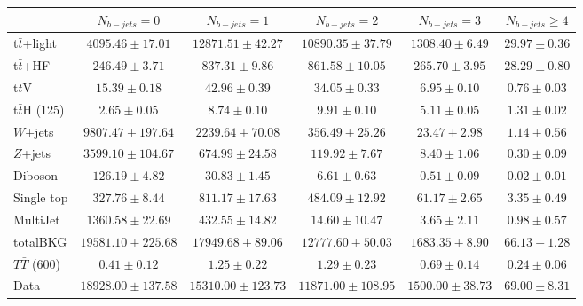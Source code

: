 \begin{tabular}{l c c c c c } \toprule
 & $N_{b-jets}= 0$ & $N_{b-jets}= 1$ & $N_{b-jets}= 2$ & $N_{b-jets}= 3$ & $N_{b-jets}\geq 4$ \\ \midrule 
 t$\bar{t}$+light & $4095.46 \pm 17.01$  & $12871.51 \pm 42.27$  & $10890.35 \pm 37.79$  & $1308.40 \pm 6.49$  & $29.97 \pm 0.36$  \\ 
 t$\bar{t}$+HF & $246.49 \pm 3.71$  & $837.31 \pm 9.86$  & $861.58 \pm 10.05$  & $265.70 \pm 3.95$  & $28.29 \pm 0.80$  \\ \midrule 
 t$\bar{t}$V & $15.39 \pm 0.18$  & $42.96 \pm 0.39$  & $34.05 \pm 0.33$  & $6.95 \pm 0.10$  & $0.76 \pm 0.03$  \\ 
 t$\bar{t}$H (125) & $2.65 \pm 0.05$  & $8.74 \pm 0.10$  & $9.91 \pm 0.10$  & $5.11 \pm 0.05$  & $1.31 \pm 0.02$  \\ 
 $W$+jets & $9807.47 \pm 197.64$  & $2239.64 \pm 70.08$  & $356.49 \pm 25.26$  & $23.47 \pm 2.98$  & $1.14 \pm 0.56$  \\ 
 $Z$+jets & $3599.10 \pm 104.67$  & $674.99 \pm 24.58$  & $119.92 \pm 7.67$  & $8.40 \pm 1.06$  & $0.30 \pm 0.09$  \\ 
 Diboson & $126.19 \pm 4.82$  & $30.83 \pm 1.45$  & $6.61 \pm 0.63$  & $0.51 \pm 0.09$  & $0.02 \pm 0.01$  \\ 
 Single top & $327.76 \pm 8.44$  & $811.17 \pm 17.63$  & $484.09 \pm 12.92$  & $61.17 \pm 2.65$  & $3.35 \pm 0.49$  \\ 
 MultiJet & $1360.58 \pm 22.69$  & $432.55 \pm 14.82$  & $14.60 \pm 10.47$  & $3.65 \pm 2.11$  & $0.98 \pm 0.57$  \\ \midrule 
 totalBKG & $19581.10 \pm 225.68$  & $17949.68 \pm 89.06$  & $12777.60 \pm 50.03$  & $1683.35 \pm 8.90$  & $66.13 \pm 1.28$  \\ \midrule 
 $T\bar{T}$ (600) & $0.41 \pm 0.12$  & $1.25 \pm 0.22$  & $1.29 \pm 0.23$  & $0.69 \pm 0.14$  & $0.24 \pm 0.06$  \\ \midrule 
 Data & $18928.00 \pm 137.58$  & $15310.00 \pm 123.73$  & $11871.00 \pm 108.95$  & $1500.00 \pm 38.73$  & $69.00 \pm 8.31$  \\ 
 \bottomrule\end{tabular}